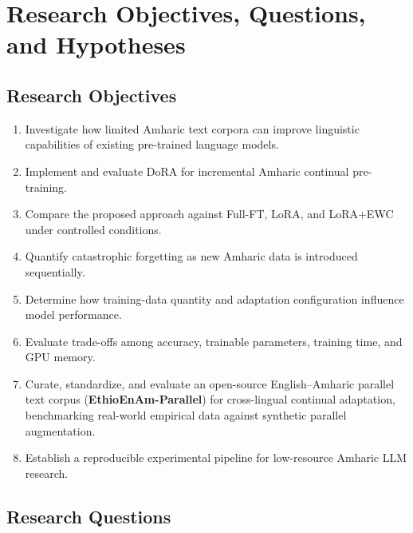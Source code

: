 \documentclass[11pt,a4paper]{article}
\begin{document}
\section{Research Objectives, Questions, and Hypotheses}
\label{sec:objectives}

\subsection{Research Objectives}

\begin{enumerate}
  \item Investigate how limited Amharic text corpora can improve
        linguistic capabilities of existing pre-trained language models.
  \item Implement and evaluate DoRA for incremental Amharic
        continual pre-training.
  \item Compare the proposed approach against Full-FT, LoRA, and
        LoRA+EWC under controlled conditions.
  \item Quantify catastrophic forgetting as new Amharic data is
        introduced sequentially.
  \item Determine how training-data quantity and adaptation
        configuration influence model performance.
  \item Evaluate trade-offs among accuracy, trainable parameters,
        training time, and GPU memory.
  \item Curate, standardize, and evaluate an open-source English--Amharic
        parallel text corpus (\textbf{EthioEnAm-Parallel}) for cross-lingual
        continual adaptation, benchmarking real-world empirical data against
        synthetic parallel augmentation.
  \item Establish a reproducible experimental pipeline for low-resource
        Amharic LLM research.
\end{enumerate}

\subsection{Research Questions}
\end{document}
